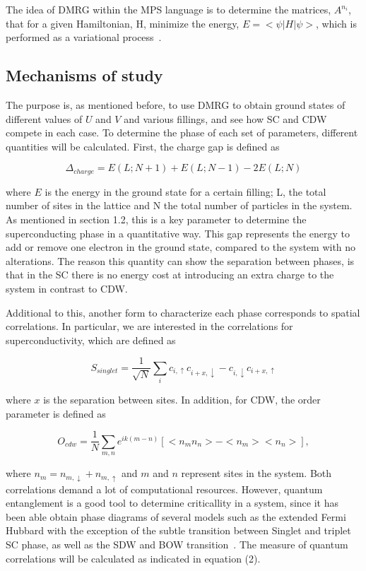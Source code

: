 \documentclass{article}
\begin{document}
The idea of DMRG within the MPS language is to determine the matrices, $A^{n_i}$, that for a given Hamiltonian, H, minimize the energy, $E=<\psi|H|\psi>$, which is performed as a variational process~\cite{DMRG,ORUS2014117}.

\subsection{Mechanisms of study}

The purpose is, as mentioned before, to use DMRG to obtain ground states of different values of $U$ and $V$ and various fillings, and see how SC and CDW compete in each case. To determine the phase of each set of parameters, different quantities will be calculated. First, the charge gap is defined as~\cite{quarterfilling}

\begin{equation}
    \Delta_{charge}=E(L;N+1)+E(L;N-1)-2E(L;N)
\end{equation}

where $E$ is the energy in the ground state for a certain filling; L, the total number of sites in the lattice and N the total number of particles in the system. As mentioned in section 1.2, this is a key parameter to determine the superconducting phase in a quantitative way. This gap represents the energy to add or remove one electron in the ground state, compared to the system with no alterations. The reason this quantity can show the separation between phases, is that in the SC there is no energy cost at introducing an extra charge to the system in contrast to CDW. 

Additional to this, another form to characterize each phase corresponds to spatial correlations. In particular, we are interested in the correlations for superconductivity, which are defined as

\begin{equation}
    S_{singlet}=\frac{1}{\sqrt{N}}\sum_{i}c_{i,\uparrow}c_{i+x,\downarrow}-c_{i,\downarrow}c_{i+x,\uparrow}
\end{equation}

where $x$ is the separation between sites. In addition, for CDW, the order parameter is defined as~\cite{Diagram}

\begin{equation}
    O_{cdw}=\frac{1}{N}\sum_{m,n}e^{ik(m-n)}[<n_mn_n>-<n_m><n_n>],
\end{equation}

where $n_m=n_{m,\downarrow}+n_{m,\uparrow}$ and $m$ and $n$ represent sites in the system. Both correlations demand a lot of computational resources. However, quantum entanglement is a good tool to determine criticallity in a system,  since it has been able obtain phase diagrams of several models such as the extended Fermi Hubbard with the exception of the subtle transition between Singlet and triplet SC phase, as well as the SDW and BOW transition~\cite{Diagram}. The measure of quantum correlations will be calculated as indicated in equation (2).
\end{document}
